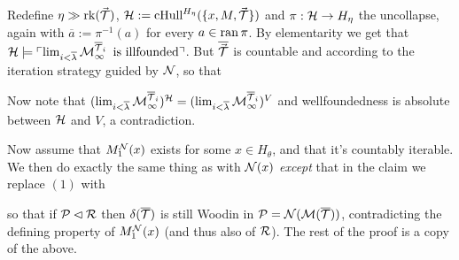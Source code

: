 \documentclass[../../main]{subfiles}
\begin{document}
{  \qquad Redefine $\eta\gg\rk(\vec\T)$,
  $\h:=\chull^{H_\eta}(\{x,M,\vec\T\})$ and $\pi:\h\to H_\eta$ the
  uncollapse, again with $\overline a:=\pi^{-1}(a)$ for every
  $a\in\ran\pi$. By elementarity we get that
  $\h\models\godel{\lim_{i<\overline\lambda}\M^{\overline\T_i}_\infty\text{ is illfounded}}$. But $\overline{\vec\T}$ is countable and
  according to the iteration strategy guided by $\N$, so that
  
  Now note that
  $(\lim_{i<\overline\lambda}\M^{\overline\T_i}_\infty)^{\h}=(\lim_{i<\overline\lambda}\M^{\overline\T_i}_\infty)^V$
  and wellfoundedness is absolute between $\h$ and $V$, a
  contradiction.
    
  \qquad Now assume that $M_1^{\N}(x)$ exists for some
  $x\in H_\theta$, and that it's countably iterable. We then do
  exactly the same thing as with $\N(x)$ \textit{except} that in the
  claim we replace $(1)$ with

  so that if $\P\pinit\R$ then $\delta(\overline\T)$ is still Woodin
  in $\P=\N(\M(\overline\T))$, contradicting the defining property of
  $M_1^{\N}(x)$ (and thus also of $\R$). The rest of the proof is a
  copy of the above.
  }
\end{document}
